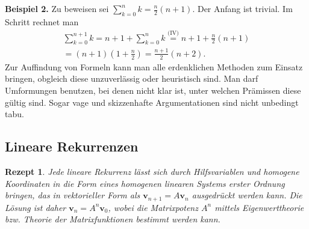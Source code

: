 \documentclass[a4paper,10pt,fleqn,twocolumn,twoside,dvipdfmx]{scrartcl}
\theoremstyle{rmbox}
\newtheorem{Rezept}{Rezept}[section]
\newcommand{\strong}[1]{\textsf{\textbf{#1}}}
\begin{document}
\strong{Beispiel 2.} Zu beweisen sei $\sum_{k=0}^n k = \tfrac{n}{2}(n+1)$.
Der Anfang ist trivial. Im Schritt rechnet man
\begin{gather*}
\sum_{k=0}^{n+1} k = n+1+\sum_{k=0}^n k
\stackrel{\text{(IV)}} = n+1+\tfrac{n}{2}(n+1)\\
= (n+1)(1+\tfrac{n}{2})
= \tfrac{n+1}{2}(n+2).
\end{gather*}
Zur Auffindung von Formeln kann man alle erdenklichen Methoden
zum Einsatz bringen, obgleich diese unzuverlässig oder heuristisch
sind. Man darf Umformungen benutzen, bei denen nicht klar ist,
unter welchen Prämissen diese gültig sind. Sogar vage und skizzenhafte
Argumentationen sind nicht unbedingt tabu.

\subsection{Lineare Rekurrenzen}

\begin{Rezept}
Jede lineare Rekurrenz lässt sich durch Hilfsvariablen und homogene
Koordinaten in die Form eines homogenen linearen Systems erster Ordnung
bringen, das in vektorieller Form als $\mathbf v_{n+1}=A\mathbf v_n$
ausgedrückt werden kann. Die Lösung ist daher
$\mathbf v_n = A^n\mathbf v_0$, wobei die Matrixpotenz $A^n$ mittels
Eigenwerttheorie bzw. Theorie der Matrixfunktionen bestimmt werden
kann.
\end{Rezept}
\end{document}
